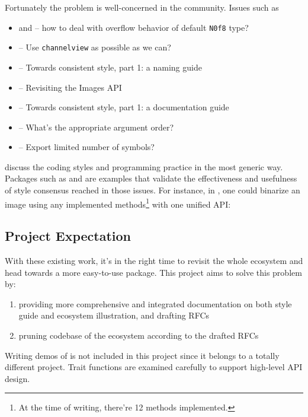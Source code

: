 Fortunately the problem is well-concerned in the community. Issues such as
\begin{itemize}
    \item {} and  -- how to deal with overflow behavior of default \texttt{N0f8} type?
    \item {} -- Use \texttt{channelview} as possible as we can?
    \item {} -- Towards consistent style, part 1: a naming guide
    \item {} -- Revisiting the Images API
    \item {} -- Towards consistent style, part 1: a documentation guide
    \item {} -- What's the appropriate argument order?
    \item {} -- Export limited number of symbols?
\end{itemize}
discuss the coding styles and programming practice in the most generic way. Packages such as \repohistogramthresholding and \repoimagebinarization are examples that validate the effectiveness and usefulness of style consensus reached in those issues. For instance, in \imagebinarization, one could binarize an image using any implemented methods\footnote{At the time of writing, there're 12 methods implemented.} with one unified API:

\subsection*{Project Expectation}
With these existing work, it's in the right time to revisit the whole \images{} ecosystem and head towards a more easy-to-use \images{} package. This project aims to solve this problem by:
\begin{enumerate}
    \item providing more comprehensive and integrated documentation on both style guide and ecosystem illustration, and drafting RFCs
    \item pruning codebase of the ecosystem according to the drafted RFCs
\end{enumerate}
Writing demos of \images{} is not included in this project since it belongs to a totally different project. Trait functions are examined carefully to support high-level API design.

